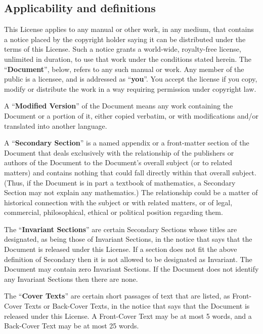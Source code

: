 \documentclass[letterpaper,twoside]{scrartcl}
\begin{document}
   

   
   \subsection{Applicability and definitions}
   

   This License applies to any manual or other work, in any medium, that
   contains a notice placed by the copyright holder saying it can be
   distributed under the terms of this License.  Such a notice grants a
   world-wide, royalty-free license, unlimited in duration, to use that
   work under the conditions stated herein.  The ``\textbf{Document}'', below,
   refers to any such manual or work.  Any member of the public is a
   licensee, and is addressed as ``\textbf{you}''.  You accept the license if you
   copy, modify or distribute the work in a way requiring permission
   under copyright law.

   A ``\textbf{Modified Version}'' of the Document means any work containing the
   Document or a portion of it, either copied verbatim, or with
   modifications and/or translated into another language.

   A ``\textbf{Secondary Section}'' is a named appendix or a front-matter section of
   the Document that deals exclusively with the relationship of the
   publishers or authors of the Document to the Document's overall subject
   (or to related matters) and contains nothing that could fall directly
   within that overall subject.  (Thus, if the Document is in part a
   textbook of mathematics, a Secondary Section may not explain any
   mathematics.)  The relationship could be a matter of historical
   connection with the subject or with related matters, or of legal,
   commercial, philosophical, ethical or political position regarding
   them.

   The ``\textbf{Invariant Sections}'' are certain Secondary Sections whose titles
   are designated, as being those of Invariant Sections, in the notice
   that says that the Document is released under this License.  If a
   section does not fit the above definition of Secondary then it is not
   allowed to be designated as Invariant.  The Document may contain zero
   Invariant Sections.  If the Document does not identify any Invariant
   Sections then there are none.

   The ``\textbf{Cover Texts}'' are certain short passages of text that are listed,
   as Front-Cover Texts or Back-Cover Texts, in the notice that says that
   the Document is released under this License.  A Front-Cover Text may
   be at most 5 words, and a Back-Cover Text may be at most 25 words.
\end{document}
